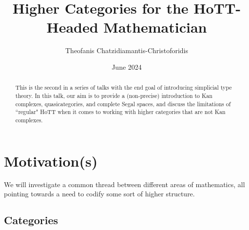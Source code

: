 \documentclass{article}
\title{Higher Categories for the HoTT-Headed Mathematician}
\author{Theofanis Chatzidiamantis-Christoforidis}
\date{June 2024}
\theoremstyle{definition}
\begin{document}
\maketitle
\tableofcontents

\begin{abstract}
    This is the second in a series of talks with the end goal of introducing simplicial type theory. In this talk, our aim is to provide a (non-precise) introduction to Kan complexes, quasicategories, and complete Segal spaces, and discuss the limitations of ``regular" HoTT when it comes to working with higher categories that are not Kan complexes.
\end{abstract}

\section{Motivation(s)}

We will investigate a common thread between different areas of mathematics, all pointing towards a need to codify some sort of higher structure.

\subsection*{Categories}
\end{document}
